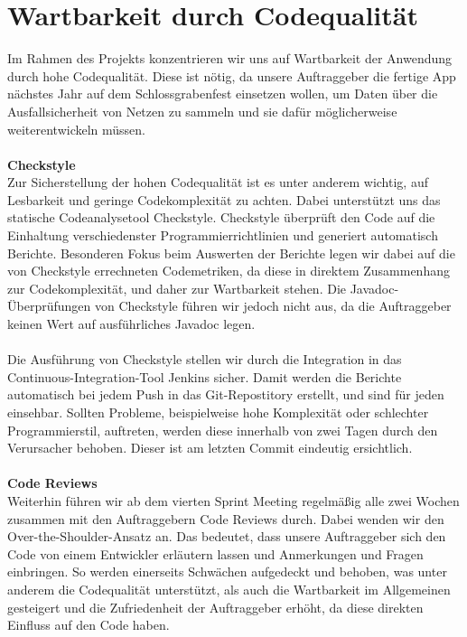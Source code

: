 \documentclass[accentcolor=tud0b,12pt,paper=a4]{tudreport}
\begin{document}
    \section{Wartbarkeit durch Codequalität}
      Im Rahmen des Projekts konzentrieren wir uns auf Wartbarkeit der Anwendung durch hohe Codequalität. Diese ist nötig, da unsere Auftraggeber die fertige App nächstes Jahr auf dem Schlossgrabenfest einsetzen wollen, um Daten über die Ausfallsicherheit von Netzen zu sammeln und sie dafür möglicherweise weiterentwickeln müssen.\\\\
      \textbf{Checkstyle}\\
      Zur Sicherstellung der hohen Codequalität ist es unter anderem wichtig, auf Lesbarkeit und geringe Codekomplexität zu achten. Dabei unterstützt uns das statische Codeanalysetool Checkstyle. Checkstyle überprüft den Code auf die Einhaltung verschiedenster Programmierrichtlinien und generiert automatisch Berichte. Besonderen Fokus beim Auswerten der Berichte legen wir dabei auf die von Checkstyle errechneten Codemetriken, da diese in direktem Zusammenhang zur Codekomplexität, und daher zur Wartbarkeit stehen. Die Javadoc-Überprüfungen von Checkstyle führen wir jedoch nicht aus, da die Auftraggeber keinen Wert auf ausführliches Javadoc legen.\\\\
      Die Ausführung von Checkstyle stellen wir durch die Integration in das Continuous-Integration-Tool Jenkins sicher. Damit werden die Berichte automatisch bei jedem Push in das Git-Repostitory erstellt, und sind für jeden einsehbar. Sollten Probleme, beispielweise hohe Komplexität oder schlechter Programmierstil, auftreten, werden diese innerhalb von zwei Tagen durch den Verursacher behoben. Dieser ist am letzten Commit eindeutig ersichtlich.\\\\
      \textbf{Code Reviews}\\
      Weiterhin führen wir ab dem vierten Sprint Meeting regelmäßig alle zwei Wochen zusammen mit den Auftraggebern Code Reviews durch. Dabei wenden wir den Over-the-Shoulder-Ansatz an. Das bedeutet, dass unsere Auftraggeber sich den Code von einem Entwickler erläutern lassen und Anmerkungen und Fragen einbringen. So werden einerseits Schwächen aufgedeckt und behoben, was unter anderem die Codequalität unterstützt, als auch die Wartbarkeit im Allgemeinen gesteigert und die Zufriedenheit der Auftraggeber erhöht, da diese direkten Einfluss auf den Code haben.\\\\
\end{document}
